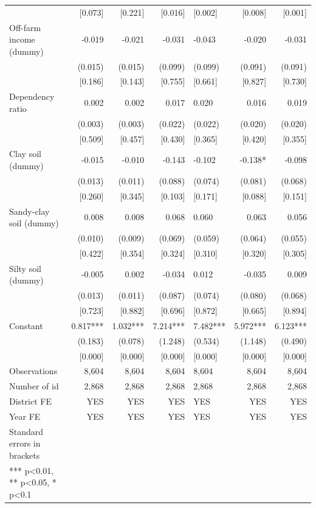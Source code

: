 \documentclass[
]{article}
\begin{document}
\begin{landscape}
\begin{ThreePartTable}
\begin{longtable}[t]{lrrrlrr}
 & {}[0.073] & {}[0.221] & {}[0.016] & {}[0.002] & {}[0.008] & {}[0.001]\\
Off-farm income (dummy) & -0.019 & -0.021 & -0.031 & -0.043 & -0.020 & -0.031\\
 & (0.015) & (0.015) & (0.099) & (0.099) & (0.091) & (0.091)\\
 & {}[0.186] & {}[0.143] & {}[0.755] & {}[0.661] & {}[0.827] & {}[0.730]\\
Dependency ratio & 0.002 & 0.002 & 0.017 & 0.020 & 0.016 & 0.019\\
 & (0.003) & (0.003) & (0.022) & (0.022) & (0.020) & (0.020)\\
 & {}[0.509] & {}[0.457] & {}[0.430] & {}[0.365] & {}[0.420] & {}[0.355]\\
Clay soil (dummy) & -0.015 & -0.010 & -0.143 & -0.102 & -0.138* & -0.098\\
 & (0.013) & (0.011) & (0.088) & (0.074) & (0.081) & (0.068)\\
 & {}[0.260] & {}[0.345] & {}[0.103] & {}[0.171] & {}[0.088] & {}[0.151]\\
Sandy-clay soil (dummy) & 0.008 & 0.008 & 0.068 & 0.060 & 0.063 & 0.056\\
 & (0.010) & (0.009) & (0.069) & (0.059) & (0.064) & (0.055)\\
 & {}[0.422] & {}[0.354] & {}[0.324] & {}[0.310] & {}[0.320] & {}[0.305]\\
Silty soil (dummy) & -0.005 & 0.002 & -0.034 & 0.012 & -0.035 & 0.009\\
 & (0.013) & (0.011) & (0.087) & (0.074) & (0.080) & (0.068)\\
 & {}[0.723] & {}[0.882] & {}[0.696] & {}[0.872] & {}[0.665] & {}[0.894]\\
Constant & 0.817*** & 1.032*** & 7.214*** & 7.482*** & 5.972*** & 6.123***\\
 & (0.183) & (0.078) & (1.248) & (0.534) & (1.148) & (0.490)\\
 & {}[0.000] & {}[0.000] & {}[0.000] & {}[0.000] & {}[0.000] & {}[0.000]\\
Observations & 8,604 & 8,604 & 8,604 & 8,604 & 8,604 & 8,604\\
Number of id & 2,868 & 2,868 & 2,868 & 2,868 & 2,868 & 2,868\\
District FE & YES & YES & YES & YES & YES & YES\\
Year FE & YES & YES & YES & YES & YES & YES\\
Standard errors in brackets &  &  &  &  &  & \\
*** p<0.01, ** p<0.05, * p<0.1 &  &  &  &  &  & \\*
\end{longtable}
\end{ThreePartTable}
\endgroup{}
\end{landscape}
\newpage
\end{document}

